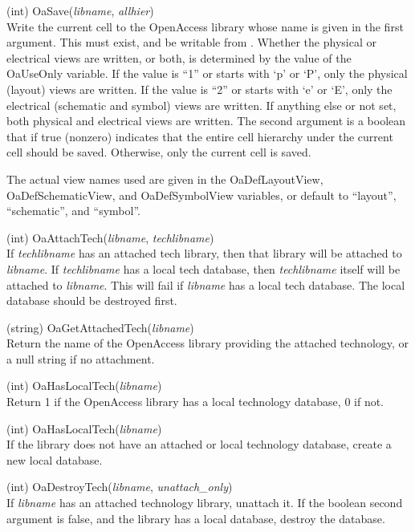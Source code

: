 \begin{description}
\item{(int) \vt OaSave({\it libname\/}, {\it allhier\/})}\\
Write the current cell to the OpenAccess library whose name is given
in the first argument.  This must exist, and be writable from {\Xic}. 
Whether the physical or electrical views are written, or both, is
determined by the value of the {\et OaUseOnly} variable.  If the value
is ``1'' or starts with `p' or `P', only the physical (layout) views
are written.  If the value is ``2'' or starts with `e' or `E', only
the electrical (schematic and symbol) views are written.  If anything
else or not set, both physical and electrical views are written.  The
second argument is a boolean that if true (nonzero) indicates that the
entire cell hierarchy under the current cell should be saved. 
Otherwise, only the current cell is saved.
 
The actual view names used are given in the {\et OaDefLayoutView},
{\et OaDefSchematicView}, and {\et OaDefSymbolView} variables, or
default to ``layout'', ``schematic'', and ``symbol''.

\item{(int) \vt OaAttachTech({\it libname\/}, {\it techlibname\/})}\\
If {\it techlibname} has an attached tech library, then that library
will be attached to {\it libname}.  If {\it techlibname} has a local
tech database, then {\it techlibname} itself will be attached to {\it
libname}.  This will fail if {\it libname} has a local tech database. 
The local database should be destroyed first.

\item{(string) \vt OaGetAttachedTech({\it libname\/})}\\
Return the name of the OpenAccess library providing the attached
technology, or a null string if no attachment.

\item{(int) \vt OaHasLocalTech({\it libname\/})}\\
Return 1 if the OpenAccess library has a local technology database, 0
if not.

\item{(int) \vt OaHasLocalTech({\it libname\/})}\\
If the library does not have an attached or local technology database,
create a new local database.

\item{(int) \vt OaDestroyTech({\it libname\/}, {\it unattach\_only\/})}\\
If {\it libname} has an attached technology library, unattach it.  If
the boolean second argument is false, and the library has a local
database, destroy the database.
\end{description}
\fi


